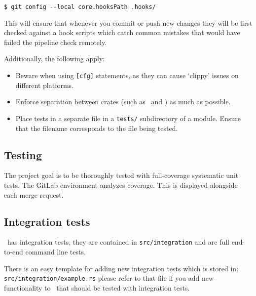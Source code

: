 \begin{verbatim}
$ git config --local core.hooksPath .hooks/
\end{verbatim}

This will ensure that whenever you commit or push new changes they will be first checked against
a hook scripts which catch common mistakes that would have failed the pipeline check remotely.

Additionally, the following apply:
\begin{itemize}
  \item Beware when using \verb|[cfg]| statements, as they can cause `clippy' issues on different platforms.
  \item Enforce separation between crates (such as \gourd\ and \gourdwrap) as much as possible.
  \item Place tests in a separate file in a \verb|tests/| subdirectory of a module.
        Ensure that the filename corresponds to the file being tested.
\end{itemize}

\subsection{Testing}

The project goal is to be thoroughly tested with full-coverage systematic unit tests.
The GitLab environment analyzes coverage. This is displayed alongside each merge request.

\subsection{Integration tests}

\gourd\ has integration tests, they are contained in \texttt{src/integration} and
are full end-to-end command line tests.

There is an easy template for adding new integration tests which is stored in: \\
\texttt{src/integration/example.rs} please refer to that file if you add
new functionality to \gourd\ that should be tested with integration tests.
